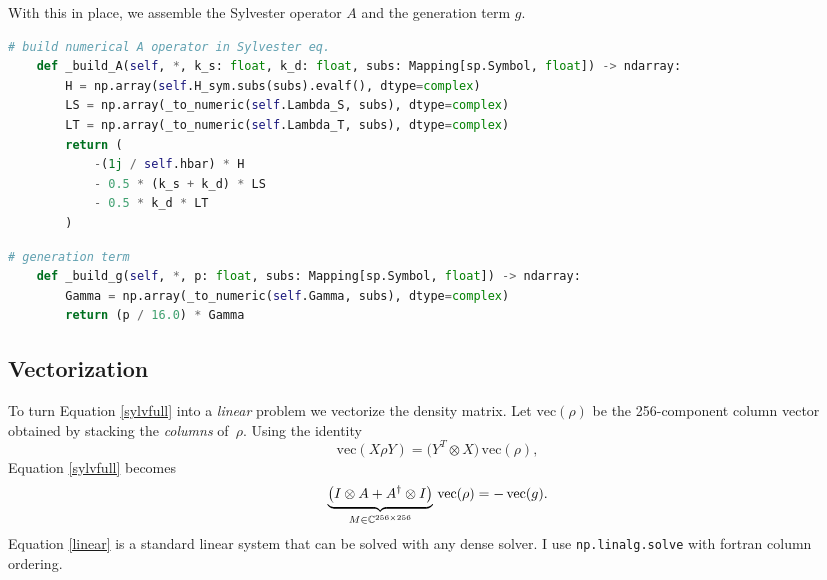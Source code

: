 \documentclass[svgnames]{article}
\begin{document}
With this in place, we assemble the Sylvester operator \(A\) and the
generation term \(g\).
\begin{lstlisting}[language=Python]
    # build numerical A operator in Sylvester eq.
    def _build_A(self, *, k_s: float, k_d: float, subs: Mapping[sp.Symbol, float]) -> ndarray:
        H = np.array(self.H_sym.subs(subs).evalf(), dtype=complex)
        LS = np.array(_to_numeric(self.Lambda_S, subs), dtype=complex)
        LT = np.array(_to_numeric(self.Lambda_T, subs), dtype=complex)
        return (
            -(1j / self.hbar) * H
            - 0.5 * (k_s + k_d) * LS
            - 0.5 * k_d * LT
        )
\end{lstlisting}

\begin{lstlisting}[language=Python]
    # generation term
    def _build_g(self, *, p: float, subs: Mapping[sp.Symbol, float]) -> ndarray:
        Gamma = np.array(_to_numeric(self.Gamma, subs), dtype=complex)
        return (p / 16.0) * Gamma
\end{lstlisting}

\subsection{Vectorization}

To turn Equation \ref{sylvfull} into a \emph{linear} problem we
vectorize the density matrix.  Let $\text{vec}(\rho)$ be the
256-component column vector obtained by stacking the
\emph{columns} of~$\rho$.  Using the identity
\[
    \text{vec}(X\rho Y)=\bigl(Y^{T}\otimes X\bigr)\,
    \text{vec}(\rho),
\]%
Equation \ref{sylvfull} becomes
\begin{align}\label{linear}
    \underbrace{\bigl(I\otimes A+A^\dagger\otimes I\bigr)}_{%
    M\in\mathbb{C}^{256\times256}}\,
    \text{vec}(\rho) = -\,\text{vec}(g).
\end{align}
Equation \ref{linear} is a standard linear system that can be solved
with any dense solver. I use \verb|np.linalg.solve| with fortran column
ordering. 
\end{document}
